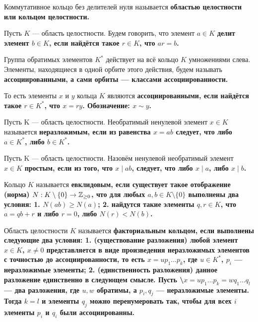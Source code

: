 \begin{defn}
Коммутативное кольцо без делителей нуля называется \bf{областью целостности} или \bf{кольцом целостности}.
\end{defn}

\begin{defn}
Пусть \(K\) --- область целостности. Будем говорить, что элемент \(a\in K\) \bf{делит} элемент \(b\in K\), если найдётся такое \(r \in K\), что \(ar=b\).

Группа обратимых элементов \(K^*\) действует на всё кольцо \(K\) умножениями слева. Элементы, находящиеся в одной орбите этого действия, будем называть \bf{ассоциированными}, а сами орбиты --- \bf{классами ассоциированности}.

То есть элементы \(x\) и \(y\) кольца \(K\) являются \bf{ассоциированными}, если найдётся такое \(r \in K^*\), что \(x=ry\). Обозначение: \(x \sim y\).
\end{defn}

\begin{defn}
Пусть K --- область целостности. Необратимый ненулевой элемент \(x \in K\) называется \bf{неразложимым}, если из равенства \(x=ab\) следует, что либо \(a \in K^*\), либо \(b \in K^*\).
\end{defn}

\begin{defn}
Пусть K --- область целостности. Назовём ненулевой необратимый элемент \(x \in K\) \bf{простым}, если из того, что \(x \mid ab\), следует, что либо \(x \mid a\), либо \(x \mid b\).
\end{defn}

\begin{defn}
Кольцо \(K\) называется \bf{евклидовым}, если существует такое отображение (\bf{норма}) \(N : K \setminus \{0\} \rightarrow \mathbb{Z}_{\ge 0}\), что для любых \(a,b \in K \setminus \{0\}\) выполнены два условия:
1. \(N(ab) \ge N(a)\);
2. найдутся такие элементы \(q , r\in K\), что \(a=qb+r\) и либо \(r=0\), либо \(N(r) < N(b)\).

\end{defn}

\begin{defn}
Область целостности \(K\) называется \bf{факториальным кольцом}, если выполнены следующие два условия:
1. (\bf{существование разложения}) любой элемент \(x \in K\), \(x \neq 0\) представляется в виде произведения неразложимых элементов с точностью до ассоциированности, то есть \(x = u p_1 \ldots p_k\), где \(u \in K^*\), \(p_i\) --- неразложимые элементы;
2. (\bf{единственность разложения}) данное разложение единственно в следующем смысле. Пусть \textbackslash{}\(x = u p_1 \ldots p_k = w q_1 \ldots q_l\) --- два разложения, где \(u,w\) обратимы, а \(p_i,q_j\) --- неразложимые элементы. Тогда \(k=l\) и элементы \(q_j\) можно перенумеровать так, чтобы для всех \(i\) элементы \(p_i\) и \(q_i\) были ассоциированны.

\end{defn}

